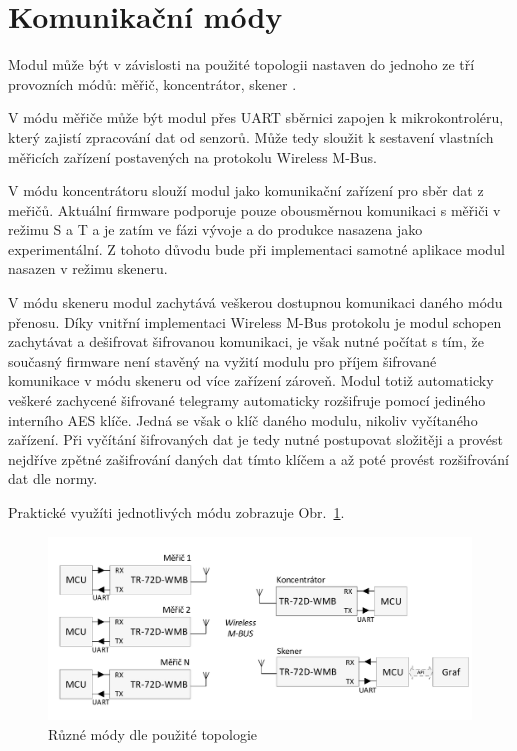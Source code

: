 \section{Komunikační módy}

Modul může být v závislosti na použité topologii nastaven do jednoho ze tří provozních módů: měřič, koncentrátor, skener \cite{ModulIQRF}. 

V módu měřiče může být modul přes UART sběrnici zapojen k mikrokontroléru, který zajistí zpracování dat od senzorů. Může tedy sloužit k sestavení vlastních měřicích zařízení postavených na protokolu Wireless M-Bus.

V módu koncentrátoru slouží modul jako komunikační zařízení pro sběr dat z meřičů. Aktuální firmware podporuje pouze obousměrnou komunikaci s měřiči v režimu S a T a je zatím ve fázi vývoje a do produkce nasazena jako experimentální. Z tohoto důvodu bude při implementaci samotné aplikace modul nasazen v režimu skeneru.

V módu skeneru modul zachytává veškerou dostupnou komunikaci daného módu přenosu. Díky vnitřní implementaci Wireless M-Bus protokolu je modul schopen zachytávat a dešifrovat šifrovanou komunikaci, je však nutné počítat s tím, že současný firmware není stavěný na vyžití modulu pro příjem šifrované komunikace v módu skeneru od více zařízení zároveň. Modul totiž automaticky veškeré zachycené šifrované telegramy automaticky rozšifruje pomocí jediného interního AES klíče. Jedná se však o klíč daného modulu, nikoliv vyčítaného zařízení. Při vyčítání šifrovaných dat je tedy nutné postupovat složitěji a provést nejdříve zpětné zašifrování daných dat tímto klíčem a až poté provést rozšifrování dat dle normy.

Praktické využíti jednotlivých módu zobrazuje Obr.~\ref{TopologieIQRF}.

 \begin{figure}[!ht]
  \begin{center}
    \includegraphics[scale=0.65]{obrazky/modul_topologie}
  \end{center}
  \caption{Různé módy dle použité topologie \cite{ModulIQRF}}
	\label{TopologieIQRF}
\end{figure}


